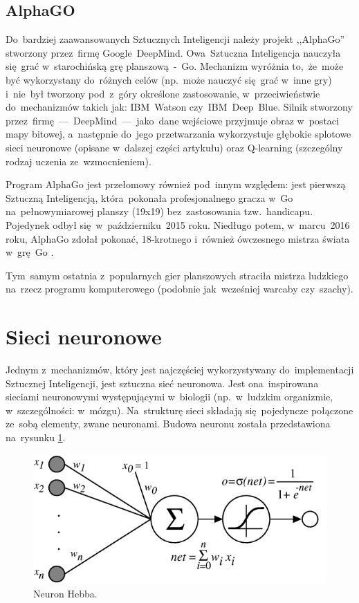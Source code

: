 \documentclass[oneside, 11pt, a4paper]{article}
\begin{document}
\begin{multicols}{2}
\subsection{AlphaGO}
Do~bardziej zaawansowanych Sztucznych Inteligencji należy projekt ,,AlphaGo''\cite{AlphaGO} stworzony przez~firmę Google~DeepMind. Owa~Sztuczna Inteligencja nauczyła się~grać w~starochińską grę planszową~-~Go. Mechanizm wyróżnia to,~że~może być wykorzystany do~różnych celów (np.~może nauczyć się~grać w~inne gry) i~nie~był tworzony pod~z~góry określone zastosowanie, w~przeciwieństwie do~mechanizmów takich jak: IBM~Watson czy~IBM~Deep~Blue. Silnik stworzony przez~firmę~---~DeepMind~---~jako~dane wejściowe przyjmuje obraz w~postaci mapy bitowej, a~następnie do~jego przetwarzania wykorzystuje głębokie splotowe sieci neuronowe (opisane w~dalszej części artykułu) oraz Q-learning (szczególny rodzaj uczenia ze~wzmocnieniem).

Program AlphaGo jest przełomowy również pod~innym względem: jest pierwszą Sztuczną Inteligencją, która~pokonała profesjonalnego gracza w~Go \cite{FanHuiGO} na~pełnowymiarowej planszy (19x19) bez~zastosowania tzw.~handicapu. Pojedynek odbył się~w~październiku~2015 roku. Niedługo potem, w~marcu~2016 roku, AlphaGo zdołał pokonać, 18-krotnego i~również ówczesnego mistrza świata w~grę~Go \cite{LeeSedolGO}.

Tym~samym ostatnia z~popularnych gier planszowych straciła mistrza ludzkiego na~rzecz programu komputerowego (podobnie jak~wcześniej warcaby\cite{checkersSolved} czy~szachy\cite{newborn1997kasparov}).

\section{Sieci neuronowe}
Jednym z~mechanizmów, który jest najczęściej wykorzystywany do~implementacji Sztucznej Inteligencji, jest sztuczna sieć neuronowa. Jest ona~inspirowana sieciami neuronowymi występującymi w~biologii (np.~w~ludzkim organizmie, w~szczególności: w~mózgu). Na~strukturę sieci składają się~pojedyncze połączone ze~sobą elementy, zwane neuronami. Budowa neuronu została przedstawiona na~rysunku \ref{fig:hebb-neuron}.
\begin{figure}[H]
	\includegraphics[width=0.9\linewidth, keepaspectratio]{img/sigmoid-neuron.png}
	\vspace{-2mm}
	\caption{Neuron Hebba.}
	\label{fig:hebb-neuron}
\end{figure}


\end{multicols}
\end{document}
